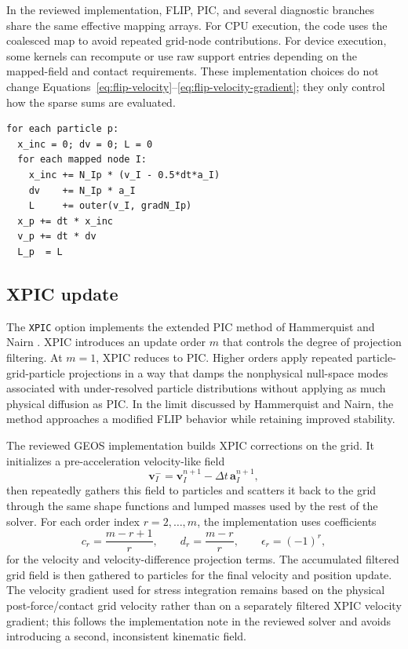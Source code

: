 In the reviewed implementation, FLIP, PIC, and several diagnostic branches share the same effective mapping arrays.  For CPU execution, the code uses the coalesced map to avoid repeated grid-node contributions.  For device execution, some kernels can recompute or use raw support entries depending on the mapped-field and contact requirements.  These implementation choices do not change Equations~\eqref{eq:flip-velocity}--\eqref{eq:flip-velocity-gradient}; they only control how the sparse sums are evaluated.

\begin{lstlisting}[caption={FLIP grid-to-particle update.},basicstyle=\ttfamily\small]
for each particle p:
  x_inc = 0; dv = 0; L = 0
  for each mapped node I:
    x_inc += N_Ip * (v_I - 0.5*dt*a_I)
    dv    += N_Ip * a_I
    L     += outer(v_I, gradN_Ip)
  x_p += dt * x_inc
  v_p += dt * dv
  L_p  = L
\end{lstlisting}

\subsection{XPIC update}
\label{subsec:xpic-update}

The \texttt{XPIC} option implements the extended PIC method of Hammerquist and Nairn \cite{hammerquist2017xpic}.  XPIC introduces an update order $m$ that controls the degree of projection filtering.  At $m=1$, XPIC reduces to PIC.  Higher orders apply repeated particle-grid-particle projections in a way that damps the nonphysical null-space modes associated with under-resolved particle distributions without applying as much physical diffusion as PIC.  In the limit discussed by Hammerquist and Nairn, the method approaches a modified FLIP behavior while retaining improved stability.

The reviewed GEOS implementation builds XPIC corrections on the grid.  It initializes a pre-acceleration velocity-like field
\begin{equation}
  \boldsymbol{v}^{-}_I = \boldsymbol{v}^{n+1}_I-\Delta t\,\boldsymbol{a}^{n+1}_I,
  \label{eq:xpic-vminus}
\end{equation}
then repeatedly gathers this field to particles and scatters it back to the grid through the same shape functions and lumped masses used by the rest of the solver.  For each order index $r=2,\ldots,m$, the implementation uses coefficients
\begin{equation}
  c_r=\frac{m-r+1}{r},
  \qquad
  d_r=\frac{m-r}{r},
  \qquad
  \epsilon_r=(-1)^r,
  \label{eq:xpic-coefficients}
\end{equation}
for the velocity and velocity-difference projection terms.  The accumulated filtered grid field is then gathered to particles for the final velocity and position update.  The velocity gradient used for stress integration remains based on the physical post-force/contact grid velocity rather than on a separately filtered XPIC velocity gradient; this follows the implementation note in the reviewed solver and avoids introducing a second, inconsistent kinematic field.

